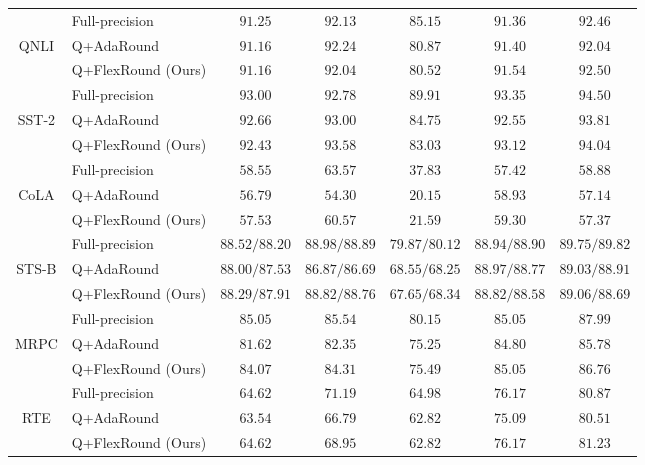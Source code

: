 \documentclass{article}
\theoremstyle{plain}
\theoremstyle{definition}
\theoremstyle{remark}
\begin{document}
\begin{table}[h]
\begin{center}
\begin{tabular}{clccccc}
\midrule
& Full-precision & $91.25$ & $92.13$ & $85.15$ & $91.36$ & $92.46$ \\
\cmidrule{2-7}
QNLI & Q+AdaRound & $91.16$ & $\mathbf{92.24}$ & $\mathbf{80.87}$ & $91.40$ & $92.04$ \\
& Q+FlexRound (Ours)& $\mathbf{91.16}$ & $92.04$ & $80.52$ & $\mathbf{91.54}$ & $\mathbf{92.50}$ \\
\midrule
& Full-precision & $93.00$ & $92.78$ & $89.91$ & $93.35$ & $94.50$ \\
\cmidrule{2-7}
SST-2 & Q+AdaRound & $\mathbf{92.66}$ & $93.00$ & $\mathbf{84.75}$ & $92.55$ & $93.81$ \\
& Q+FlexRound (Ours)& $92.43$ & $\mathbf{93.58}$ & $83.03$ & $\mathbf{93.12}$ & $\mathbf{94.04}$ \\
\midrule
& Full-precision & $58.55$ & $63.57$ & $37.83$ & $57.42$ & $58.88$ \\ 
\cmidrule{2-7}
CoLA & Q+AdaRound & $56.79$ & $54.30$ & $20.15$ & $58.93$ &  $57.14$ \\
& Q+FlexRound (Ours)& $\mathbf{57.53}$ & $\mathbf{60.57}$ & $\mathbf{21.59}$ & $\mathbf{59.30}$ & $\mathbf{57.37}$  \\
\midrule
& Full-precision & $88.52 / 88.20$ & $88.98 / 88.89$ & $79.87 / 80.12$ & $88.94 / 88.90$ & $89.75 / 89.82$ \\ 
\cmidrule{2-7}
STS-B & Q+AdaRound & $88.00 / 87.53$ & $86.87 / 86.69$ & $\mathbf{68.55} / 68.25$ & $\mathbf{88.97} / \mathbf{88.77}$ & $89.03 / \mathbf{88.91}$ \\
& Q+FlexRound (Ours)& $\mathbf{88.29} / \mathbf{87.91}$ & $\mathbf{88.82} / \mathbf{88.76}$ & $67.65 / \mathbf{68.34}$ & $88.82 / 88.58$ & $\mathbf{89.06} / 88.69$ \\
\midrule
& Full-precision & $85.05$ & $85.54$ & $80.15$ & $85.05$ & $87.99$ \\ 
\cmidrule{2-7}
MRPC & Q+AdaRound & $81.62$ & $82.35$ & $75.25$ & $84.80$ &  $85.78$ \\
& Q+FlexRound (Ours)& $\mathbf{84.07}$ & $\mathbf{84.31}$ & $\mathbf{75.49}$ & $\mathbf{85.05}$ & $\mathbf{86.76}$ \\
\midrule
& Full-precision & $64.62$ & $71.19$ & $64.98$ & $76.17$ & $80.87$ \\ 
\cmidrule{2-7}
RTE & Q+AdaRound & $63.54$ & $66.79$ & $62.82$ & $75.09$ & $80.51$ \\
& Q+FlexRound (Ours)& $\mathbf{64.62}$ & $\mathbf{68.95}$ & $\mathbf{62.82}$ & $\mathbf{76.17}$ & $\mathbf{81.23}$ \\
\bottomrule
\end{tabular}
\end{center}
\end{table}
\end{document}
